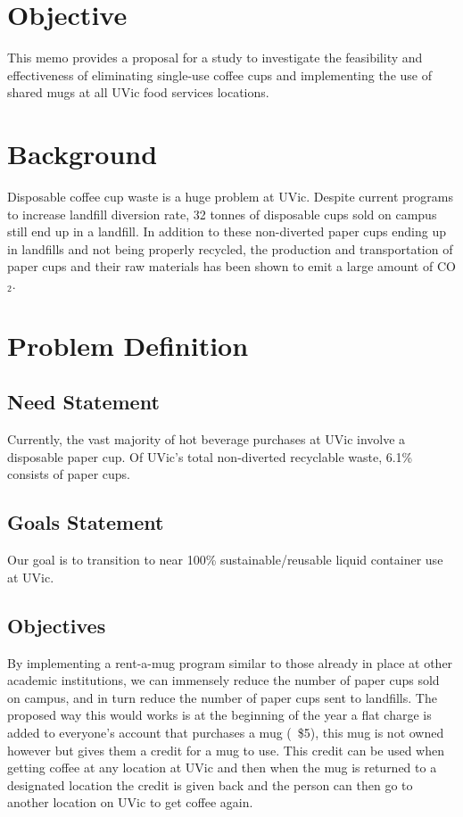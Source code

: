 \documentclass[letterpaper,11pt]{texMemo}
\begin{document}
\maketitle

\section*{Objective}
This memo provides a proposal for a study to investigate the feasibility and
effectiveness of eliminating single-use coffee cups and implementing the
use of shared mugs at all UVic food services
locations.
\section*{Background}
Disposable coffee cup waste is a huge problem at UVic. Despite current programs
to increase landfill diversion rate, 32 tonnes of disposable cups sold on campus
still end up in a landfill.\cite{myrefitem} In addition to these non-diverted
paper cups ending up in landfills and not being properly recycled, the
production and transportation of paper cups and their raw materials has been
shown to emit a large amount of CO$_{2}$.\cite{papercupemissions}
\section*{Problem Definition}
\subsection*{Need Statement}
Currently, the vast majority of hot beverage purchases at UVic involve a
disposable paper cup. %
Of UVic's total non-diverted recyclable waste, 6.1\% consists of paper
cups.%
\subsection*{Goals Statement}
Our goal is to transition to near 100\% sustainable/reusable liquid container
use at UVic.
\subsection*{Objectives}
By implementing a rent-a-mug program similar to those already in place at
other academic institutions,%
we can immensely reduce the number of paper cups sold on campus, and in
turn reduce the number of paper cups sent to landfills.
The proposed way this would works is at the 
beginning of the year a flat charge is added to everyone's account that purchases 
a mug (~\$5), this mug is not owned however but gives them a credit for a mug to 
use. This credit can be used when getting coffee at any location at UVic and then 
when the mug is returned to a designated location the credit is given back and 
the person can then go to another location on UVic to get coffee again.\\
\end{document}
